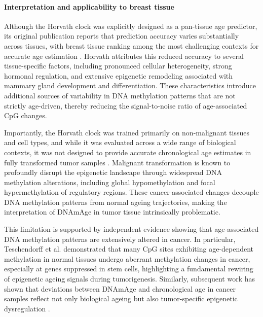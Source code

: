 \documentclass[10pt]{extarticle}
\begin{document}
\paragraph{Interpretation and applicability to breast tissue}
Although the Horvath clock was explicitly designed as a pan-tissue age predictor, its original publication reports that prediction accuracy varies substantially across tissues, with breast tissue ranking among the most challenging contexts for accurate age estimation \cite{Horvath2013}. Horvath attributes this reduced accuracy to several tissue-specific factors, including pronounced cellular heterogeneity, strong hormonal regulation, and extensive epigenetic remodeling associated with mammary gland development and differentiation. These characteristics introduce additional sources of variability in DNA methylation patterns that are not strictly age-driven, thereby reducing the signal-to-noise ratio of age-associated CpG changes.

Importantly, the Horvath clock was trained primarily on non-malignant tissues and cell types, and while it was evaluated across a wide range of biological contexts, it was not designed to provide accurate chronological age estimates in fully transformed tumor samples \cite{Horvath2013}. Malignant transformation is known to profoundly disrupt the epigenetic landscape through widespread DNA methylation alterations, including global hypomethylation and focal hypermethylation of regulatory regions. These cancer-associated changes decouple DNA methylation patterns from normal ageing trajectories, making the interpretation of DNAmAge in tumor tissue intrinsically problematic.

This limitation is supported by independent evidence showing that age-associated DNA methylation patterns are extensively altered in cancer. In particular, Teschendorff et al. \cite{Teschendorff2010} demonstrated that many CpG sites exhibiting age-dependent methylation in normal tissues undergo aberrant methylation changes in cancer, especially at genes suppressed in stem cells, highlighting a fundamental rewiring of epigenetic ageing signals during tumorigenesis. Similarly, subsequent work has shown that deviations between DNAmAge and chronological age in cancer samples reflect not only biological ageing but also tumor-specific epigenetic dysregulation \cite{Zhang2019}.
\end{document}
